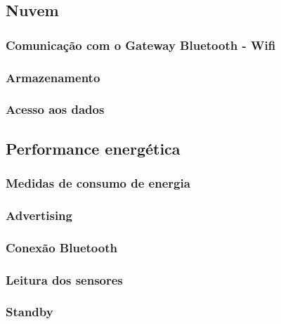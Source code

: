 \subsection{Nuvem}

\subsubsection{Comunicação com o Gateway Bluetooth - Wifi}

\subsubsection{Armazenamento}

\subsubsection{Acesso aos dados}

\subsection{Performance energética}

\subsubsection{Medidas de consumo de energia}

\subsubsection{Advertising}

\subsubsection{Conexão Bluetooth}

\subsubsection{Leitura dos sensores}

\subsubsection{Standby}